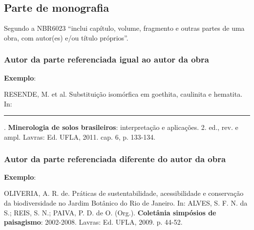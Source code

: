 \subsection{Parte de monografia}

Segundo a NBR6023 \cite[p.4]{NBR6023:2002} ``inclui capítulo, volume, fragmento e outras partes de uma obra, com autor(es) e/ou título próprios''.

\begin{flushleft}
\begin{singlespace}
\end{singlespace}
\end{flushleft}


\subsubsection{Autor da parte referenciada igual ao autor da obra}

\begin{exemplomanual}
\textbf{Exemplo}:\\
\begin{singlespace}
RESENDE, M. et al. Substituição isomórfica em goethita, caulinita e hematita. In: \rule{1cm}{0.4pt}. \textbf{Minerologia de solos brasileiros}: interpretação e aplicações. 2. ed., rev. e ampl. Lavras: Ed. UFLA, 2011. cap. 6, p. 133-134.
\end{singlespace}
\end{exemplomanual}


\subsubsection{Autor da parte referenciada diferente do autor da obra}

\begin{exemplomanual}
\textbf{Exemplo}:\\
\begin{singlespace}
OLIVERIA, A. R. de. Práticas de sustentabilidade, acessibilidade e conservação da biodiversidade no Jardim Botânico do Rio de Janeiro. In: ALVES, S. F. N. da S.; REIS, S. N.; PAIVA, P. D. de O. (Org.). \textbf{Coletânia simpósios de paisagismo}: 2002-2008. Lavras: Ed. UFLA, 2009. p. 44-52.
\end{singlespace}
\end{exemplomanual}


